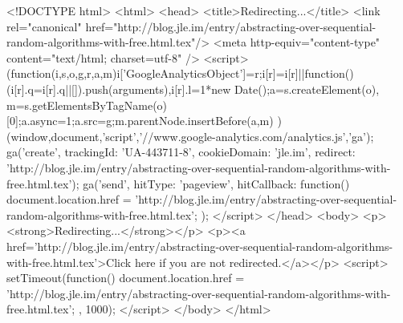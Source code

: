 <!DOCTYPE html>
<html>
<head>
<title>Redirecting...</title>
<link rel="canonical" href="http://blog.jle.im/entry/abstracting-over-sequential-random-algorithms-with-free.html.tex"/>
<meta http-equiv="content-type" content="text/html; charset=utf-8" />
<script>
(function(i,s,o,g,r,a,m){i['GoogleAnalyticsObject']=r;i[r]=i[r]||function(){
(i[r].q=i[r].q||[]).push(arguments)},i[r].l=1*new Date();a=s.createElement(o),
m=s.getElementsByTagName(o)[0];a.async=1;a.src=g;m.parentNode.insertBefore(a,m)
})(window,document,'script','//www.google-analytics.com/analytics.js','ga');
ga('create', { trackingId: 'UA-443711-8', cookieDomain: 'jle.im', redirect: 'http://blog.jle.im/entry/abstracting-over-sequential-random-algorithms-with-free.html.tex'});
ga('send', { hitType: 'pageview', hitCallback: function() { document.location.href = 'http://blog.jle.im/entry/abstracting-over-sequential-random-algorithms-with-free.html.tex'; } });
</script>
</head>
<body>
  <p><strong>Redirecting...</strong></p>
  <p><a href='http://blog.jle.im/entry/abstracting-over-sequential-random-algorithms-with-free.html.tex'>Click here if you are not redirected.</a></p>
  <script>
    setTimeout(function() { document.location.href = 'http://blog.jle.im/entry/abstracting-over-sequential-random-algorithms-with-free.html.tex'; }, 1000);
  </script>
</body>
</html>
